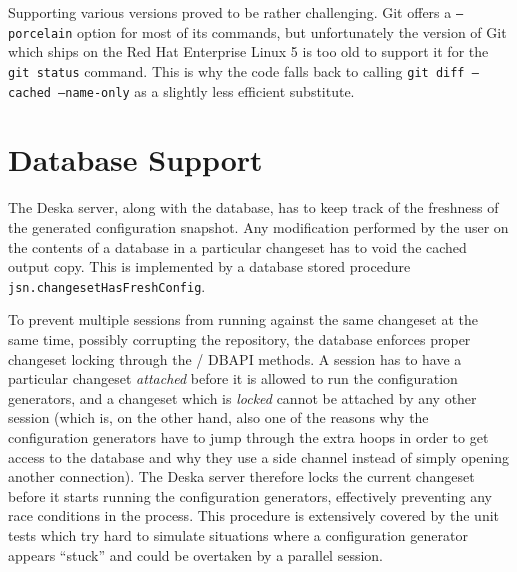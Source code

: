 \documentclass[deska]{subfiles}
\begin{document}
Supporting various versions proved to be rather challenging.  Git offers a {\tt --porcelain} option for most of its
commands, but unfortunately the version of Git which ships on the Red Hat Enterprise Linux 5 is too old to support it
for the {\tt git status} command.  This is why the code falls back to calling {\tt git diff --cached --name-only} as a
slightly less efficient substitute.

\section{Database Support}
\label{sec:cfggen-db-support}

The Deska server, along with the database, has to keep track of the freshness of the generated configuration snapshot.
Any modification performed by the user on the contents of a database in a particular changeset has to void the cached
output copy.  This is implemented by a database stored procedure {\tt jsn.changesetHasFreshConfig}.

To prevent multiple sessions from running against the same changeset at the same time, possibly corrupting the
repository, the database enforces proper changeset locking through the
/ DBAPI methods.  A session has to have a
particular changeset {\em attached} before it is allowed to run the configuration generators, and a changeset which is
{\em locked} cannot be attached by any other session (which is, on the other hand, also one of the reasons why the
configuration generators have to jump through the extra hoops in order to get access to the database and why they use a
side channel instead of simply opening another connection).  The Deska server therefore locks the current changeset
before it starts running the configuration generators, effectively preventing any race conditions in the process.  This
procedure is extensively covered by the unit tests which try hard to simulate situations where a configuration generator
appears ``stuck'' and could be overtaken by a parallel session.
\end{document}
